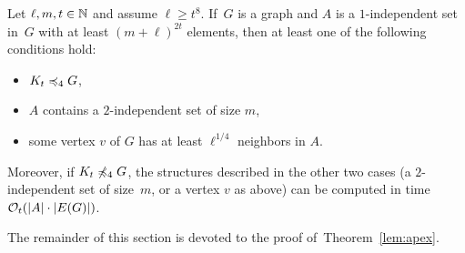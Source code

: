 \begin{lemma}\label{lem:apex}
Let $\ell,m,t\in \mathbb{N}$ and assume $\ell\geq t^{8}$. 
If~$G$ is a graph and $A$ is a $1$-independent set in~$G$
with at least $(m+\ell)^{2t}$ elements,
then at least one of the following conditions hold:
\begin{itemize}
  \item $K_t\preccurlyeq_{4} G$,
\item  $A$ contains a $2$-independent set of size $m$, 
\item  some vertex $v$ of $G$
has at least $\ell^{1/4}$ neighbors in $A$.
\end{itemize}
Moreover, if $K_t\not\preccurlyeq_4G$, the
structures described in the other two cases (a $2$-independent set 
of size~$m$, or a vertex $v$ as above) can be 
computed in time $\mathcal{O}_t(|A|\cdot |E(G)|)$. 
\end{lemma}
The remainder of this section is devoted to the proof of~Theorem~\ref{lem:apex}.
%
%
